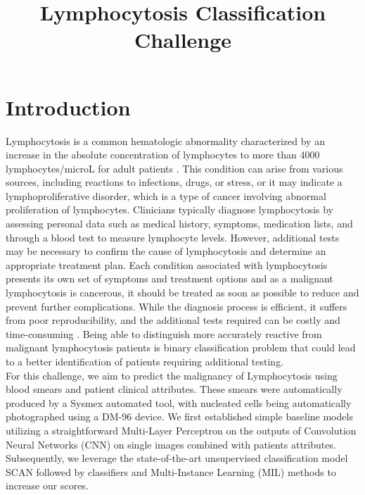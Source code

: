 \documentclass{midl}
\title[DLMI]{Lymphocytosis Classification Challenge}
\begin{document}
\maketitle

\begin{abstract}
\end{abstract}

\section{Introduction}
\label{sec:introduction}

Lymphocytosis is a common hematologic abnormality characterized by an increase in the absolute concentration of lymphocytes to more than 4000 lymphocytes/microL for adult patients \cite{Hamad_2023}. This condition can arise from various sources, including reactions to infections, drugs, or stress, or it may indicate a lymphoproliferative disorder, which is a type of cancer involving abnormal proliferation of lymphocytes. Clinicians typically diagnose lymphocytosis by assessing personal data such as medical history, symptoms, medication lists, and through a blood test to measure lymphocyte levels. However, additional tests may be necessary to confirm the cause of lymphocytosis and determine an appropriate treatment plan. Each condition associated with lymphocytosis presents its own set of symptoms and treatment options and as a malignant lymphocytosis is cancerous, it should be treated as soon as possible to reduce and prevent further complications. While the diagnosis process is efficient, it suffers from poor reproducibility, and the additional tests required can be costly and time-consuming \cite{Sahasrabudhe_2021}. Being able to distinguish more accurately reactive from malignant lymphocytosis patients is binary classification problem that could lead to a better identification of patients requiring additional testing.
\\
For this challenge, we aim to predict the malignancy of Lymphocytosis using blood smears and patient clinical attributes. These smears were automatically produced by a Sysmex automated tool, with nucleated cells being automatically photographed using a DM-96 device. We first established simple baseline models utilizing a straightforward Multi-Layer Perceptron on the outputs of Convolution Neural Networks (CNN) on single images combined with patients attributes. Subsequently, we leverage the state-of-the-art unsupervised classification model SCAN followed by classifiers and Multi-Instance Learning (MIL) methods to increase our scores.
\end{document}

